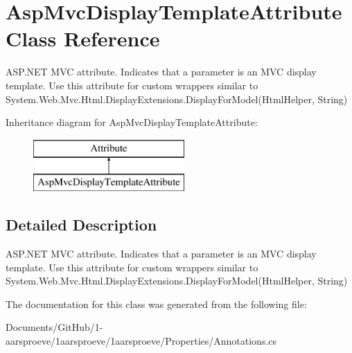 \hypertarget{class_asp_mvc_display_template_attribute}{}\section{Asp\+Mvc\+Display\+Template\+Attribute Class Reference}
\label{class_asp_mvc_display_template_attribute}


A\+S\+P.\+N\+E\+T M\+V\+C attribute. Indicates that a parameter is an M\+V\+C display template. Use this attribute for custom wrappers similar to {\ttfamily System.\+Web.\+Mvc.\+Html.\+Display\+Extensions.\+Display\+For\+Model(\+Html\+Helper, String)}  


Inheritance diagram for Asp\+Mvc\+Display\+Template\+Attribute\+:\begin{figure}[H]
\begin{center}
\leavevmode
\includegraphics[height=2.000000cm]{class_asp_mvc_display_template_attribute}
\end{center}
\end{figure}


\subsection{Detailed Description}
A\+S\+P.\+N\+E\+T M\+V\+C attribute. Indicates that a parameter is an M\+V\+C display template. Use this attribute for custom wrappers similar to {\ttfamily System.\+Web.\+Mvc.\+Html.\+Display\+Extensions.\+Display\+For\+Model(\+Html\+Helper, String)} 



The documentation for this class was generated from the following file\+:\begin{DoxyCompactItemize}
\item 
Documents/\+Git\+Hub/1-\/aarsproeve/1aarsproeve/1aarsproeve/\+Properties/Annotations.\+cs\end{DoxyCompactItemize}

